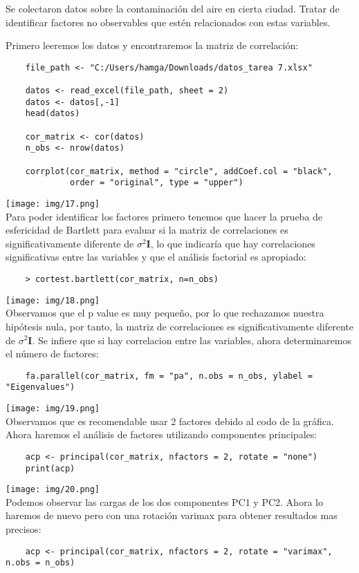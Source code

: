 \begin{problem}{3}
Se colectaron datos sobre la contaminación del aire en cierta ciudad. Tratar de identificar factores no observables que estén relacionados con estas variables.
\end{problem}

\begin{sol}
Primero leeremos los datos y encontraremos la matriz de correlación:
    \begin{verbatim}
    file_path <- "C:/Users/hamga/Downloads/datos_tarea 7.xlsx"
    
    datos <- read_excel(file_path, sheet = 2)
    datos <- datos[,-1]
    head(datos)
    
    cor_matrix <- cor(datos)
    n_obs <- nrow(datos)
    
    corrplot(cor_matrix, method = "circle", addCoef.col = "black",
             order = "original", type = "upper")
    \end{verbatim}
    \texttt{[image: img/17.png]}\\
       Para poder identificar los factores primero tenemos que hacer la prueba de esfericidad de Bartlett para evaluar si la matriz de correlaciones es significativamente diferente de $\sigma^2 \bm{I}$, lo que indicaría que hay correlaciones significativas entre las variables y que el análisis factorial es apropiado:
    \begin{verbatim}
    > cortest.bartlett(cor_matrix, n=n_obs)
    \end{verbatim}
    \texttt{[image: img/18.png]}\\
  Observamos que el p value es muy pequeño, por lo que rechazamos nuestra hipótesis nula, por tanto, la matriz de correlaciones es significativamente diferente de $\sigma^2 \bm{I}$. Se infiere que si hay correlacion entre las variables, ahora determinaremos el número de factores:
    \begin{verbatim}
    fa.parallel(cor_matrix, fm = "pa", n.obs = n_obs, ylabel = "Eigenvalues")
    \end{verbatim}
    \texttt{[image: img/19.png]}\\
    Observamos que es recomendable usar 2 factores debido al codo de la gráfica. Ahora haremos el análisis de factores utilizando componentes principales:
    \begin{verbatim}
    acp <- principal(cor_matrix, nfactors = 2, rotate = "none")
    print(acp)
    \end{verbatim}
    \texttt{[image: img/20.png]}\\
     Podemos observar las cargas de los dos componentes PC1 y PC2. Ahora lo haremos de nuevo pero con una rotación varimax para obtener resultados mas precisos:
    \begin{verbatim}
    acp <- principal(cor_matrix, nfactors = 2, rotate = "varimax", n.obs = n_obs)
    

\end{verbatim}
\end{sol}
